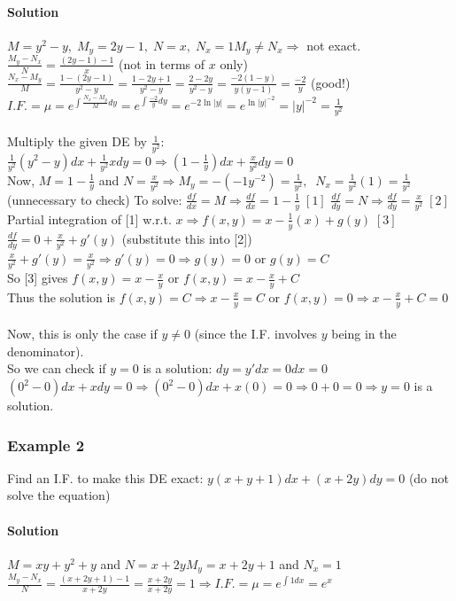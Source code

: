 \documentclass{article}
\begin{document}
\paragraph{Solution} $M=y^2-y,\;M_y=2y-1,\;N=x,\;N_x=1$\qquad $M_y\neq N_x\Rightarrow$ not exact.
\\$\frac{M_y-N_x}{N}=\frac{(2y-1)-1}{x}$ (not in terms of $x$ only)
\\$\frac{N_x-M_y}{M}=\frac{1-(2y-1)}{y^2-y}=\frac{1-2y+1}{y^2-y}=\frac{2-2y}{y^2-y}=\frac{-2(1-y)}{y(y-1)}=\frac{-2}{y}$ (good!)
\\$I.F.=\mu=e^{\int\frac{N_x-M_y}{M}dy}=e^{\int\frac{-2}{y}dy}=e^{-2\ln|y|}=e^{\ln|y|^{-2}}=|y|^{-2}=\frac{1}{y^2}$
\\\\Multiply the given DE by $\frac{1}{y^2}$: $\frac{1}{y^2}(y^2-y)dx+\frac{1}{y^2}xdy=0\Rightarrow(1-\frac{1}{y})dx+\frac{x}{y^2}dy=0$
\\Now, $M=1-\frac{1}{y}$ and $N=\frac{x}{y^2}\Rightarrow M_y=-(-1y^{-2})=\frac{1}{y^2},\;\;N_x=\frac{1}{y^2}(1)=\frac{1}{y^2}$ (unnecessary to check)
\newpage To solve: $\frac{df}{dx}=M\Rightarrow\frac{df}{dx}=1-\frac{1}{y}\;[1]$
\qquad $\frac{df}{dy}=N\Rightarrow\frac{df}{dy}=\frac{x}{y^2}\;[2]$
\\Partial integration of [1] w.r.t. $x\Rightarrow f(x,y)=x-\frac{1}{y}(x)+g(y)\;[3]$
\\$\frac{df}{dy}=0+\frac{x}{y^2}+g'(y)$ (substitute this into [2])
\\$\frac{x}{y^2}+g'(y)=\frac{x}{y^2}\Rightarrow g'(y)=0\Rightarrow g(y)=0$ or $g(y)=C$
\\So [3] gives $f(x,y)=x-\frac{x}{y}$ or $f(x,y)=x-\frac{x}{y}+C$
\\Thus the solution is $f(x,y)=C\Rightarrow x-\frac{x}{y}=C$ or $f(x,y)=0\Rightarrow x-\frac{x}{y}+C=0$
\\\\Now, this is only the case if $y\neq0$ (since the I.F. involves $y$ being in the denominator).
\\So we can check if $y=0$ is a solution: $dy=y'dx=0dx=0$
\\$(0^2-0)dx+xdy=0\Rightarrow(0^2-0)dx+x(0)=0\Rightarrow0+0=0\Rightarrow y=0$ is a solution.

\subsubsection{Example 2}
Find an I.F. to make this DE exact: $y(x+y+1)dx+(x+2y)dy=0$ (do not solve the equation)
\paragraph{Solution}
$M=xy+y^2+y$ and $N=x+2y$\qquad $M_y=x+2y+1$ and $N_x=1$
\\$\frac{M_y-N_x}{N}=\frac{(x+2y+1)-1}{x+2y}=\frac{x+2y}{x+2y}=1\Rightarrow I.F.=\mu=e^{\int 1dx}=e^x$
\end{document}
